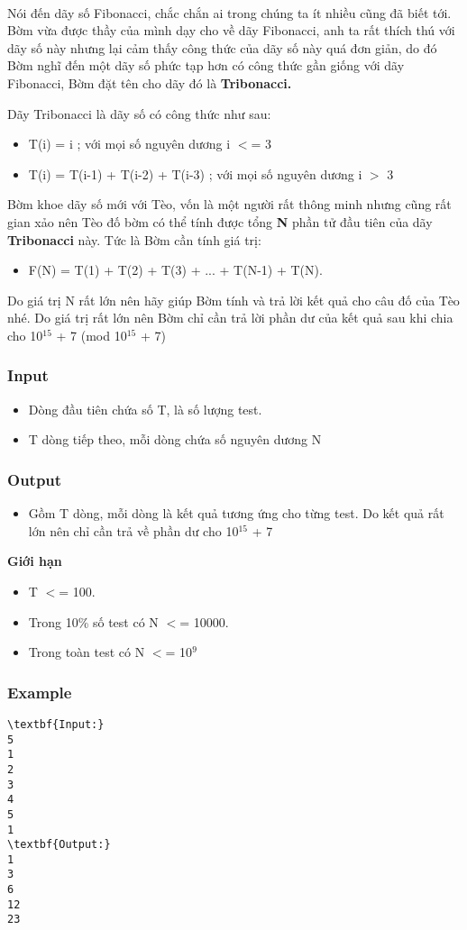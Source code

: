 

 

Nói đến dãy số Fibonacci, chắc chắn ai trong chúng ta ít nhiều cũng đã biết tới. Bờm vừa được thầy của mình dạy cho về dãy Fibonacci, anh ta rất thích thú với dãy số này nhưng lại cảm thấy công thức của dãy số này quá đơn giản, do đó Bờm nghĩ đến một dãy số phức tạp hơn có công thức gần giống với dãy Fibonacci, Bờm đặt tên cho dãy đó là \textbf{ Tribonacci. }

Dãy Tribonacci là dãy số có công thức như sau:
\begin{itemize}
	\item T(i) = i ; với mọi số nguyên dương i $<$= 3
	\item T(i) = T(i-1) + T(i-2) + T(i-3) ; với mọi số nguyên dương i $>$ 3
\end{itemize}

Bờm khoe dãy số mới với Tèo, vốn là một người rất thông minh nhưng cũng rất gian xảo nên Tèo đố bờm có thể tính được tổng \textbf{ N } phần tử đầu tiên của dãy \textbf{ Tribonacci } này. Tức là Bờm cần tính giá trị:
\begin{itemize}
	\item F(N) = T(1) + T(2) + T(3) + ... + T(N-1) + T(N).
\end{itemize}

Do giá trị N rất lớn nên hãy giúp Bờm tính và trả lời kết quả cho câu đố của Tèo nhé. Do giá trị rất lớn nên Bờm chỉ cần trả lời phần dư của kết quả sau khi chia cho 10$^15 $ + 7 (mod 10$^15 $ + 7)

\subsubsection{Input}
\begin{itemize}
	\item Dòng đầu tiên chứa số T, là số lượng test.
	\item T dòng tiếp theo, mỗi dòng chứa số nguyên dương N
\end{itemize}

\subsubsection{Output}
\begin{itemize}
	\item Gồm T dòng, mỗi dòng là kết quả tương ứng cho từng test. Do kết quả rất lớn nên chỉ cần trả về phần dư cho 10$^15 $ + 7
\end{itemize}

\textbf{Giới hạn }
\begin{itemize}
	\item T $<$= 100.
	\item Trong 10\% số test có N $<$= 10000.
	\item Trong toàn test có N $<$= 10$^9 $
\end{itemize}

\subsubsection{Example}
\begin{verbatim}
\textbf{Input:}
5
1
2
3
4
5
1
\textbf{Output:}
1
3
6
12
23
\end{verbatim}